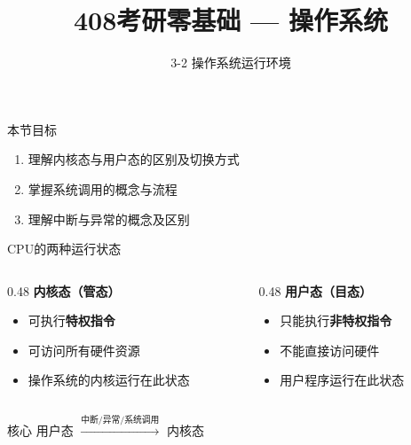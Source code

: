 \documentclass[10pt, aspectratio=169]{beamer}
\title{408考研零基础 --- 操作系统}
\subtitle{3-2 操作系统运行环境}
\author{}
\date{}
\begin{document}
\begin{frame}{本节目标}
    \begin{enumerate}
        \item 理解内核态与用户态的区别及切换方式
        \item 掌握系统调用的概念与流程
        \item 理解中断与异常的概念及区别
    \end{enumerate}
\end{frame}

\begin{frame}{CPU的两种运行状态}
    \begin{columns}
        \begin{column}{0.48\textwidth}
            \textbf{内核态（管态）}
            \begin{itemize}
                \item 可执行\textbf{特权指令}
                \item 可访问所有硬件资源
                \item 操作系统的内核运行在此状态
            \end{itemize}
        \end{column}
        \begin{column}{0.48\textwidth}
            \textbf{用户态（目态）}
            \begin{itemize}
                \item 只能执行\textbf{非特权指令}
                \item 不能直接访问硬件
                \item 用户程序运行在此状态
            \end{itemize}
        \end{column}
    \end{columns}
    \vspace{0.5em}
    \begin{alertblock}{核心}
        用户态 $\xrightarrow{\text{中断/异常/系统调用}}$ 内核态
    \end{alertblock}
\end{frame}
\end{document}
